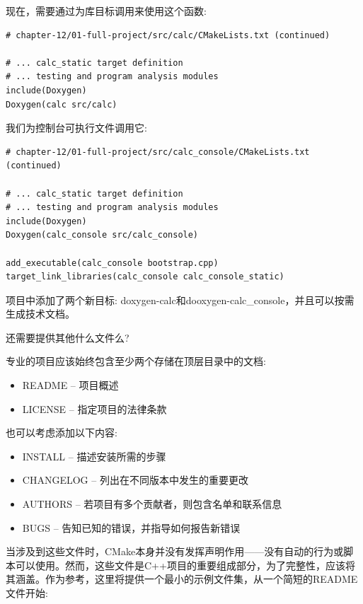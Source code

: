 现在，需要通过为库目标调用来使用这个函数:

\begin{lstlisting}[style=styleCMake]
# chapter-12/01-full-project/src/calc/CMakeLists.txt (continued)

# ... calc_static target definition
# ... testing and program analysis modules
include(Doxygen)
Doxygen(calc src/calc)
\end{lstlisting}

我们为控制台可执行文件调用它:

\begin{lstlisting}[style=styleCMake]
# chapter-12/01-full-project/src/calc_console/CMakeLists.txt (continued)

# ... calc_static target definition
# ... testing and program analysis modules
include(Doxygen)
Doxygen(calc_console src/calc_console)

add_executable(calc_console bootstrap.cpp)
target_link_libraries(calc_console calc_console_static)
\end{lstlisting}

项目中添加了两个新目标: doxygen-calc和dooxygen-calc\_console，并且可以按需生成技术文档。

还需要提供其他什么文件么?


专业的项目应该始终包含至少两个存储在顶层目录中的文档:

\begin{itemize}
\item 
README – 项目概述

\item 
LICENSE – 指定项目的法律条款
\end{itemize}

也可以考虑添加以下内容:

\begin{itemize}
\item 
INSTALL – 描述安装所需的步骤

\item 
CHANGELOG – 列出在不同版本中发生的重要更改

\item 
AUTHORS – 若项目有多个贡献者，则包含名单和联系信息

\item 
BUGS – 告知已知的错误，并指导如何报告新错误
\end{itemize}

当涉及到这些文件时，CMake本身并没有发挥声明作用——没有自动的行为或脚本可以使用。然而，这些文件是C++项目的重要组成部分，为了完整性，应该将其涵盖。作为参考，这里将提供一个最小的示例文件集，从一个简短的README文件开始:

